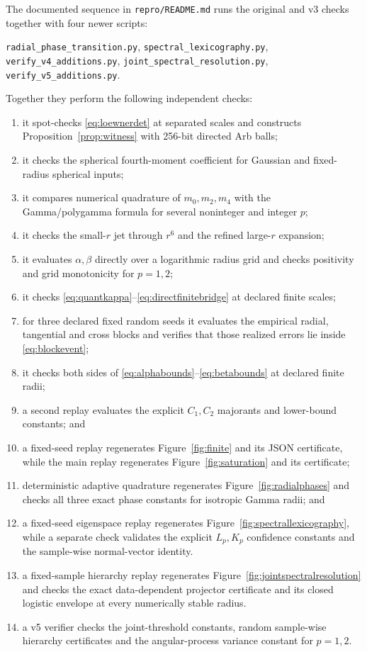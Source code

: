 \documentclass[11pt]{article}
\begin{document}
The documented sequence in \texttt{repro/README.md} runs the original and v3 checks together with four newer
scripts:
\begin{center}
\texttt{radial\_phase\_transition.py},\quad
\texttt{spectral\_lexicography.py},\quad
\texttt{verify\_v4\_additions.py},\quad
\texttt{joint\_spectral\_resolution.py},\quad
\texttt{verify\_v5\_additions.py}.
\end{center}
Together they perform the following independent checks:
\begin{enumerate}[leftmargin=2em]
 \item it spot-checks \eqref{eq:loewnerdet} at separated scales and constructs Proposition~\ref{prop:witness} with
 256-bit directed Arb balls;
 \item it checks the spherical fourth-moment coefficient for Gaussian and fixed-radius spherical inputs;
 \item it compares numerical quadrature of $m_0,m_2,m_4$ with the Gamma/polygamma formula for several
 noninteger and integer $p$;
 \item it checks the small-$r$ jet through $r^6$ and the refined large-$r$ expansion;
 \item it evaluates $\alpha,\beta$ directly over a logarithmic radius grid and checks positivity and grid
 monotonicity for $p=1,2$;
 \item it checks \eqref{eq:quantkappa}--\eqref{eq:directfinitebridge} at declared finite scales;
 \item for three declared fixed random seeds it evaluates the empirical radial, tangential and cross blocks and
 verifies that those realized errors lie inside \eqref{eq:blockevent};
 \item it checks both sides of \eqref{eq:alphabounds}--\eqref{eq:betabounds} at declared finite radii;
 \item a second replay evaluates the explicit $C_1,C_2$ majorants and lower-bound constants; and
 \item a fixed-seed replay regenerates Figure~\ref{fig:finite} and its JSON certificate, while the main replay
 regenerates Figure~\ref{fig:saturation} and its certificate;
 \item deterministic adaptive quadrature regenerates Figure~\ref{fig:radialphases} and checks all three exact
 phase constants for isotropic Gamma radii; and
 \item a fixed-seed eigenspace replay regenerates Figure~\ref{fig:spectrallexicography}, while a separate check
 validates the explicit $L_p,K_p$ confidence constants and the sample-wise normal-vector identity.
 \item a fixed-sample hierarchy replay regenerates Figure~\ref{fig:jointspectralresolution} and checks the exact
 data-dependent projector certificate and its closed logistic envelope at every numerically stable radius.
 \item a v5 verifier checks the joint-threshold constants, random sample-wise hierarchy certificates and the
 angular-process variance constant for $p=1,2$.
\end{enumerate}
\end{document}
